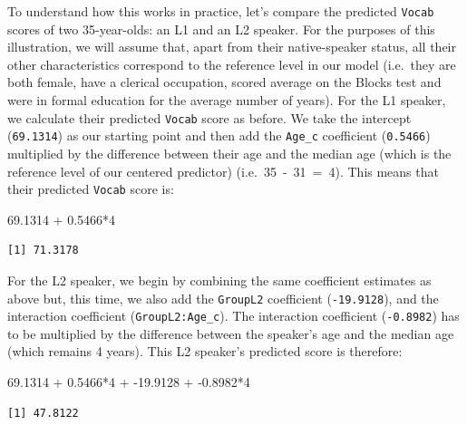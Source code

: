 \documentclass[
  letterpaper,
  DIV=11,
  numbers=noendperiod]{scrreprt}
\newenvironment{Shaded}{\begin{snugshade}}{\end{snugshade}}
\newcommand{\DecValTok}[1]{\textcolor[rgb]{0.68,0.00,0.00}{#1}}
\newcommand{\FloatTok}[1]{\textcolor[rgb]{0.68,0.00,0.00}{#1}}
\newcommand{\SpecialCharTok}[1]{\textcolor[rgb]{0.37,0.37,0.37}{#1}}
\begin{document}
To understand how this works in practice, let's compare the predicted
\texttt{Vocab} scores of two 35-year-olds: an L1 and an L2 speaker. For
the purposes of this illustration, we will assume that, apart from their
native-speaker status, all their other characteristics correspond to the
reference level in our model (i.e.~they are both female, have a clerical
occupation, scored average on the Blocks test and were in formal
education for the average number of years). For the L1 speaker, we
calculate their predicted \texttt{Vocab} score as before. We take the
intercept (\texttt{69.1314}) as our starting point and then add the
\texttt{Age\_c} coefficient (\texttt{0.5466}) multiplied by the
difference between their age and the median age (which is the reference
level of our centered predictor) (i.e.~35~-~31~=~4). This means that
their predicted \texttt{Vocab} score is:

\begin{Shaded}
\begin{Highlighting}[]
\FloatTok{69.1314} \SpecialCharTok{+} \FloatTok{0.5466}\SpecialCharTok{*}\DecValTok{4}
\end{Highlighting}
\end{Shaded}

\begin{verbatim}
[1] 71.3178
\end{verbatim}

For the L2 speaker, we begin by combining the same coefficient estimates
as above but, this time, we also add the \texttt{GroupL2} coefficient
(\texttt{-19.9128}), and the interaction coefficient
(\texttt{GroupL2:Age\_c}). The interaction coefficient
(\texttt{-0.8982}) has to be multiplied by the difference between the
speaker's age and the median age (which remains 4 years). This L2
speaker's predicted score is therefore:

\begin{Shaded}
\begin{Highlighting}[]
\FloatTok{69.1314} \SpecialCharTok{+} \FloatTok{0.5466}\SpecialCharTok{*}\DecValTok{4} \SpecialCharTok{+} \SpecialCharTok{{-}}\FloatTok{19.9128} \SpecialCharTok{+} \SpecialCharTok{{-}}\FloatTok{0.8982}\SpecialCharTok{*}\DecValTok{4}
\end{Highlighting}
\end{Shaded}

\begin{verbatim}
[1] 47.8122
\end{verbatim}
\end{document}
